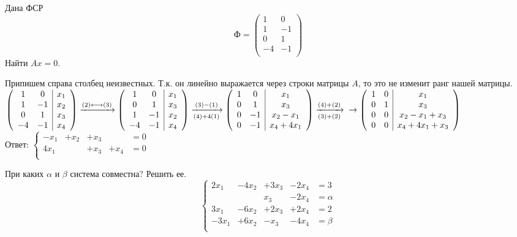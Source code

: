 \begin{prim}
	Дана ФСР
	$$
	\text{Ф}=
	\begin{pmatrix}
	1&0\\
	1&-1\\
	0&1\\
	-4&-1\\
	\end{pmatrix}
	$$
	Найти $Ax=0$.
\end{prim}
Припишем справа столбец неизвестных. Т.к. он линейно выражается через строки матрицы $A$, то это не изменит ранг нашей матрицы.\\
$
\left( \begin{array}{cc|c}
1&0&x_1\\
1&-1&x_2\\
0&1&x_3\\
-4&-1&x_4\\
\end{array}\right)
\xrightarrow{(2)\longleftrightarrow(3)}
\left( \begin{array}{cc|c}
1&0&x_1\\
0&1&x_3\\
1&-1&x_2\\
-4&-1&x_4\\
\end{array}\right)
\xrightarrow[(4)+4(1)]{(3)-(1)}
\left( \begin{array}{cc|c}
1&0&x_1\\
0&1&x_3\\
0&-1&x_2-x_1\\
0&-1&x_4+4x_1\\
\end{array}\right)
\xrightarrow[(3)+(2)]{(4)+(2)}\\
\rightarrow
\left( \begin{array}{cc|c}
1&0&x_1\\
0&1&x_3\\
0&0&x_2-x_1+x_3\\
0&0&x_4+4x_1+x_3\\
\end{array}\right)
$\\
Ответ: $\left\{ \begin{array}{rrrrl}
	-x_1&+x_2&+x_3&&=0\\
	4x_1&&+x_3&+x_4&=0\\
\end{array}
\right.$
\begin{prim}
	При каких $\alpha$ и $\beta$ система совместна? Решить ее.
	$$\left\{ \begin{array}{rrrrl}
	2x_1&-4x_2&+3x_3&-2x_4&=3\\
	&&x_3&-2x_4&=\alpha\\
	3x_1&-6x_2&+2x_3&+2x_4&=2\\
	-3x_1&+6x_2&-x_3&-4x_4&=\beta\\
	\end{array}
	\right.$$
\end{prim}

